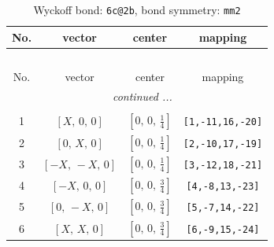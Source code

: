 \documentclass[fleqn,8pt]{jsarticle}
\begin{document}
\renewcommand{\arraystretch}{1.2}
\begin{longtable}{cccc}
\caption{Wyckoff bond: {\tt 6c@2b}, bond symmetry: {\tt mm2}}
 \\
 \hline \hline
No. & vector & center & mapping \\ \hline \endfirsthead

\multicolumn{3}{l}{\tablename\ \thetable{}} \\
 \hline \hline
No. & vector & center & mapping \\ \hline \endhead

 \hline \hline
\multicolumn{3}{r}{\footnotesize\it continued ...} \\ \endfoot

 \hline \hline
\multicolumn{3}{r}{} \\ \endlastfoot

1 & $\left[ X,\, 0,\, 0 \right]$ & $\left[ 0,\, 0,\, \frac{1}{4} \right]$ & {\tt [1,-11,16,-20]} \\ \hline
2 & $\left[ 0,\, X,\, 0 \right]$ & $\left[ 0,\, 0,\, \frac{1}{4} \right]$ & {\tt [2,-10,17,-19]} \\ \hline
3 & $\left[ - X,\, - X,\, 0 \right]$ & $\left[ 0,\, 0,\, \frac{1}{4} \right]$ & {\tt [3,-12,18,-21]} \\ \hline
4 & $\left[ - X,\, 0,\, 0 \right]$ & $\left[ 0,\, 0,\, \frac{3}{4} \right]$ & {\tt [4,-8,13,-23]} \\ \hline
5 & $\left[ 0,\, - X,\, 0 \right]$ & $\left[ 0,\, 0,\, \frac{3}{4} \right]$ & {\tt [5,-7,14,-22]} \\ \hline
6 & $\left[ X,\, X,\, 0 \right]$ & $\left[ 0,\, 0,\, \frac{3}{4} \right]$ & {\tt [6,-9,15,-24]} \\
\end{longtable}
\renewcommand{\arraystretch}{1.2}
\end{document}
